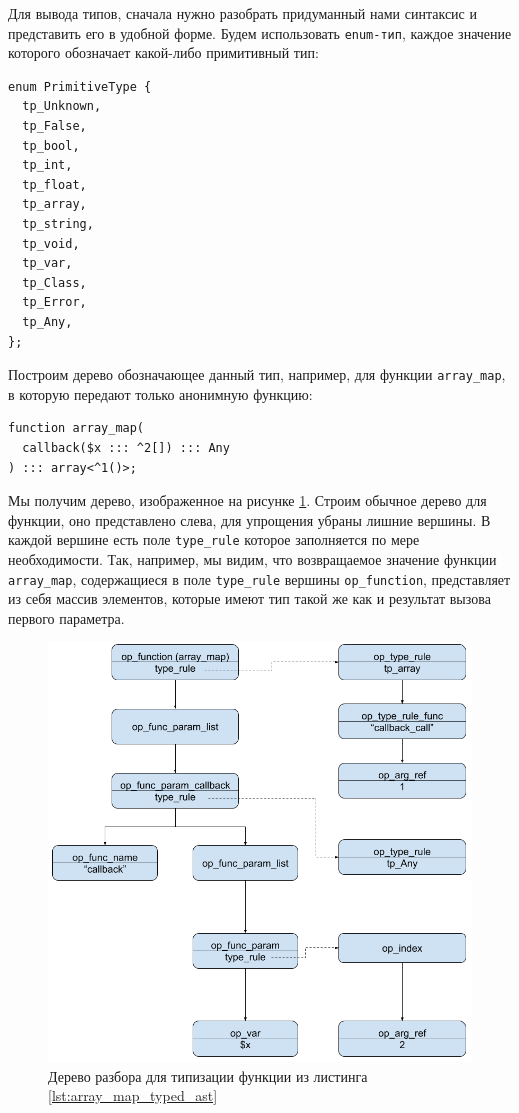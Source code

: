 Для вывода типов, сначала нужно разобрать придуманный нами синтаксис и представить его в удобной форме.
Будем использовать \verb|enum-тип|, каждое значение которого обозначает какой-либо примитивный тип:
\begin{lstlisting}
enum PrimitiveType {
  tp_Unknown,
  tp_False,
  tp_bool,
  tp_int,
  tp_float,
  tp_array,
  tp_string,
  tp_void,
  tp_var,
  tp_Class,
  tp_Error,
  tp_Any,
};
\end{lstlisting}

Построим дерево обозначающее данный тип, например, для функции \verb|array_map|, в которую передают только анонимную функцию:
\begin{lstlisting}[label={lst:array_map_typed_ast}]
function array_map(
  callback($x ::: ^2[]) ::: Any
) ::: array<^1()>;
\end{lstlisting}
Мы получим дерево, изображенное на рисунке \ref{fig:ast_for_callback}.
Строим обычное дерево для функции, оно представлено слева, для упрощения убраны лишние вершины.
В каждой вершине есть поле \verb|type_rule| которое заполняется по мере необходимости.
Так, например, мы видим, что возвращаемое значение функции \verb|array_map|, содержащиеся в поле \verb|type_rule| вершины \verb|op_function|, представляет из себя массив элементов, которые имеют тип такой же как и результат вызова первого параметра.

\begin{figure}[H]
    \caption{Дерево разбора для типизации функции из листинга \ref{lst:array_map_typed_ast}}
    \label{fig:ast_for_callback}
    \centering
    \includegraphics[width=\linewidth]{images/ast_for_callback}
\end{figure}

